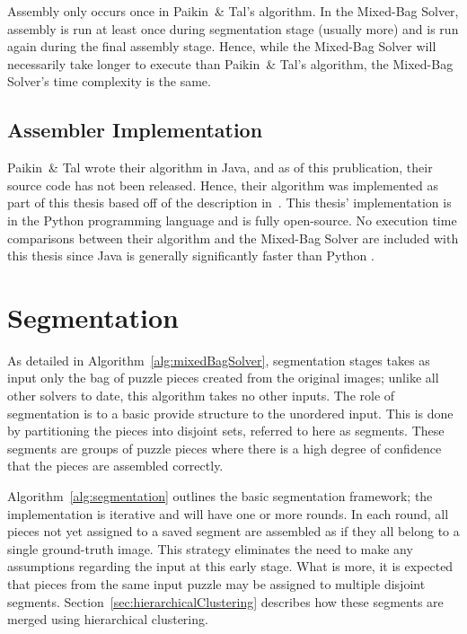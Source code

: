 Assembly only occurs once in Paikin~\& Tal's algorithm.  In the Mixed-Bag Solver, assembly is run at least once during segmentation stage (usually more) and is run again during the final assembly stage.  Hence, while the Mixed-Bag Solver will necessarily take longer to execute than Paikin~\& Tal's algorithm, the Mixed-Bag Solver's time complexity is the same.

\subsection{Assembler Implementation}\label{sec:assemblerImplementation}

Paikin~\& Tal wrote their algorithm in Java, and as of this prublication, their source code has not been released.  Hence, their algorithm was implemented as part of this thesis based off of the description in~\cite{paikin2015}.  This thesis' implementation is in the Python programming language and is fully open-source.  No execution time comparisons between their algorithm and the Mixed-Bag Solver are included with this thesis since Java is generally significantly faster than Python \cite{pythonJavaComparison}.

\section{Segmentation}\label{sec:Segmentation}

As detailed in Algorithm~\ref{alg:mixedBagSolver}, segmentation stages takes as input only the bag of puzzle pieces created from the original images; unlike all other solvers to date, this algorithm takes no other inputs.  The role of segmentation is to a basic provide structure to the unordered input.  This is done by partitioning the pieces into disjoint sets, referred to here as segments.  These segments are groups of puzzle pieces where there is a high degree of confidence that the pieces are assembled correctly.

Algorithm~\ref{alg:segmentation} outlines the basic segmentation framework; the implementation is iterative and will have one or more rounds.  In each round, all pieces not yet assigned to a saved segment are assembled as if they all belong to a single ground-truth image.  This strategy eliminates the need to make any assumptions regarding the input at this early stage.  What is more, it is expected that pieces from the same input puzzle may be assigned to multiple disjoint segments.  Section~\ref{sec:hierarchicalClustering} describes how these segments are merged using hierarchical clustering.

